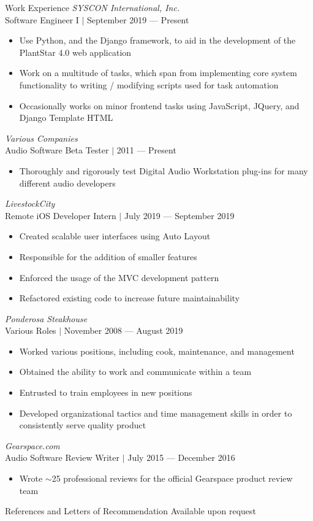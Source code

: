 \documentclass{Joseph_T_Lyons_Resume}
\newenvironment{tightlySpacedList}
{ \begin{itemize}
    \setlength{\itemsep}{0pt}
    \setlength{\parskip}{0pt}
    \setlength{\parsep}{0pt}     }
{ \end{itemize}                  }
\begin{document}
\begin{rSection}{Work Experience}
\textit{SYSCON International, Inc.}
\\Software Engineer I $\mid$ September 2019 --- Present
\begin{tightlySpacedList}
    \item Use Python, and the Django framework, to aid in the development of the
          PlantStar 4.0 web application
    \item Work on a multitude of tasks, which span from implementing core system
          functionality to writing / modifying scripts used for task automation
    \item Occasionally works on minor frontend tasks using JavaScript, JQuery,
          and Django Template HTML
\end{tightlySpacedList}

\textit{Various Companies}
\\Audio Software Beta Tester $\mid$ 2011 --- Present
\begin{tightlySpacedList}
    \item Thoroughly and rigorously test Digital Audio Workstation plug-ins for
     many different audio developers
\end{tightlySpacedList}

\textit{LivestockCity}
\\Remote iOS Developer Intern $\mid$ July 2019 --- September 2019
\begin{tightlySpacedList}
    \item Created scalable user interfaces using Auto Layout
    \item Responsible for the addition of smaller features
    \item Enforced the usage of the MVC development pattern
    \item Refactored existing code to increase future maintainability
\end{tightlySpacedList}

\textit{Ponderosa Steakhouse}
\\Various Roles $\mid$ November 2008 --- August 2019
\begin{tightlySpacedList}
    \item Worked various positions, including cook, maintenance, and management
    \item Obtained the ability to work and communicate within a team
    \item Entrusted to train employees in new positions
    \item Developed organizational tactics and time management skills in order
     to consistently serve quality product
\end{tightlySpacedList}

\textit{Gearspace.com}
\\Audio Software Review Writer $\mid$ July 2015 --- December 2016
\begin{tightlySpacedList}
    \item Wrote $\sim$25 professional reviews for the official Gearspace product
          review team
\end{tightlySpacedList}
\end{rSection}

\begin{rSection}{References and Letters of Recommendation}
Available upon request
\end{rSection}
\end{document}
